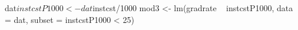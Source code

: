 \begin{Schunk}
\begin{Sinput}
 dat$instcstP1000 <- dat$instcst/1000
 mod3 <- lm(gradrate ~ instcstP1000, data = dat, subset = instcstP1000 < 25)
\end{Sinput}
\end{Schunk}
